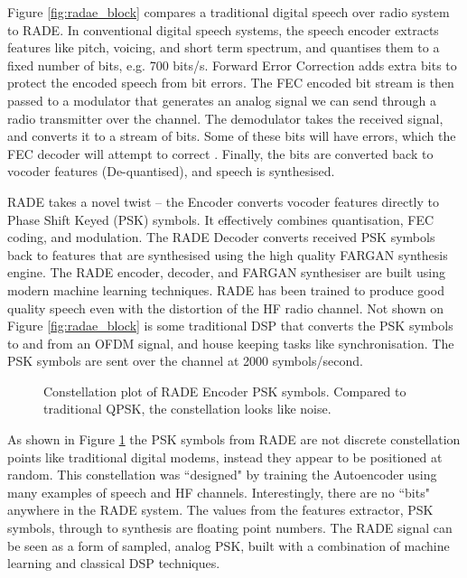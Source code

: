 \documentclass{article}
\begin{document}
Figure \ref{fig:radae_block} compares a traditional digital speech over radio system to RADE.
In conventional digital speech systems, the speech encoder extracts features like pitch, voicing, and short term spectrum, and quantises them to a fixed number of bits, e.g. 700 bits/s.  Forward Error Correction adds extra bits to protect the encoded speech from bit errors.  The FEC encoded bit stream is then passed to a modulator that generates an analog signal we can send through a radio transmitter over the channel.  The demodulator takes the received signal, and converts it to a stream of bits.  Some of these bits will have errors, which the FEC decoder will attempt to correct
.  Finally, the bits are converted back to vocoder features (De-quantised), and speech is synthesised.

RADE takes a novel twist – the Encoder converts vocoder features directly to Phase Shift Keyed (PSK) symbols. It effectively combines quantisation, FEC coding, and modulation.  The RADE Decoder converts received PSK symbols back to features that are synthesised using the high quality FARGAN synthesis engine. The RADE encoder, decoder, and FARGAN synthesiser are built using modern machine learning techniques.  RADE has been trained to produce good quality speech even with the distortion of the HF radio channel. Not shown on Figure \ref{fig:radae_block} is some traditional DSP that converts the PSK symbols to and from an OFDM signal, and house keeping tasks like synchronisation. The PSK symbols are sent over the channel at 2000 symbols/second.

\begin{figure}[h]
\caption{Constellation plot of RADE Encoder PSK symbols.  Compared to traditional QPSK, the constellation looks like noise.}
\label{fig:psk_scatter}
\begin{center}

\end{center}
\end{figure}

As shown in Figure \ref{fig:psk_scatter} the PSK symbols from RADE are not discrete constellation points like traditional digital modems, instead they appear to be positioned at random.  This constellation was ``designed" by training the Autoencoder using many examples of speech and HF channels. Interestingly, there are no ``bits" anywhere in the RADE system.  The values from the features extractor, PSK symbols, through to synthesis are floating point numbers. The RADE signal can be seen as a form of sampled, analog PSK, built with a combination of machine learning and classical DSP techniques.
\end{document}
